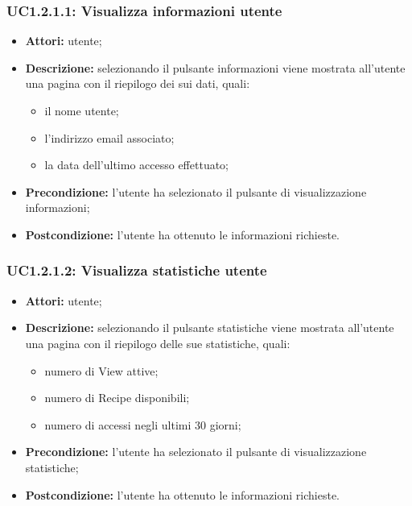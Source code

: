 \subsubsection{UC1.2.1.1: Visualizza informazioni utente}

\begin{itemize}
    \item \textbf{Attori:} utente;
    \item \textbf{Descrizione:} selezionando il pulsante informazioni viene mostrata all'utente una pagina con il riepilogo dei sui dati, quali:
    \begin{itemize}
        \item il nome utente;
        \item l'indirizzo email associato;
        \item la data dell'ultimo accesso effettuato;
    \end{itemize}
    \item \textbf{Precondizione:} l'utente ha selezionato il pulsante di visualizzazione informazioni;
    \item \textbf{Postcondizione:} l'utente ha ottenuto le informazioni richieste.
\end{itemize}

\subsubsection{UC1.2.1.2: Visualizza statistiche utente}

\begin{itemize}
    \item \textbf{Attori:} utente;
    \item \textbf{Descrizione:} selezionando il pulsante statistiche viene mostrata all'utente una pagina con il riepilogo delle sue statistiche, quali:
    \begin{itemize}
        \item numero di View attive;
        \item numero di Recipe disponibili;
        \item numero di accessi negli ultimi 30 giorni;
    \end{itemize}
    \item \textbf{Precondizione:} l'utente ha selezionato il pulsante di visualizzazione statistiche;
    \item \textbf{Postcondizione:} l'utente ha ottenuto le informazioni richieste.
\end{itemize}

